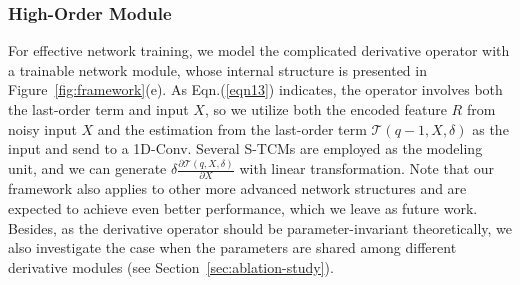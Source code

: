 \documentclass{article}
\begin{document}
{%
\vspace{-0.1cm}
\subsubsection{High-Order Module}
\label{high-order-module}
For effective network training, we model the complicated derivative operator with a trainable network module, whose internal structure is presented in Figure~{\ref{fig:framework}}(e). As Eqn.{(\ref{eqn13})} indicates, the operator involves both the last-order term and input $X$, so we utilize both the encoded feature $R$ from noisy input $X$ and the estimation from the last-order term $\mathcal{T}\left(q-1,X,\delta\right)$ as the input and send to a 1D-Conv. Several S-TCMs are employed as the modeling unit, and we can generate $\delta\frac{\partial\mathcal{T}\left(q, X, \delta\right)}{\partial X}$ with linear transformation.
Note that our framework also applies to other more advanced network structures and are expected to achieve even better performance, which we leave as future work. Besides, as the derivative operator should be parameter-invariant theoretically, we also investigate the case when the parameters are shared among different derivative modules (see Section~{\ref{sec:ablation-study}}).
}
\end{document}
